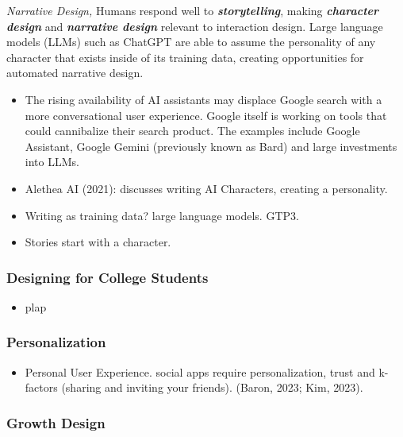 \documentclass[
  letterpaper,
  DIV=11,
  numbers=noendperiod]{scrartcl}
\providecommand{\tightlist}{%
  \setlength{\itemsep}{0pt}\setlength{\parskip}{0pt}}\usepackage{longtable,booktabs,array}
\begin{document}
\emph{Narrative Design,} Humans respond well to
\textbf{\emph{storytelling}}, making \textbf{\emph{character design}}
and \textbf{\emph{narrative design}} relevant to interaction design.
Large language models (LLMs) such as ChatGPT are able to assume the
personality of any character that exists inside of its training data,
creating opportunities for automated narrative design.

\begin{itemize}
\item
  The rising availability of AI assistants may displace Google search
  with a more conversational user experience. Google itself is working
  on tools that could cannibalize their search product. The examples
  include Google Assistant, Google Gemini (previously known as Bard) and
  large investments into LLMs.
\item
  Alethea AI (2021): discusses writing AI Characters, creating a
  personality.
\item
  Writing as training data? large language models. GTP3.
\item
  Stories start with a character.
\end{itemize}

\subsubsection{Designing for College
Students}\label{designing-for-college-students}

\begin{itemize}
\tightlist
\item
  plap
\end{itemize}

\subsubsection{Personalization}\label{personalization}

\begin{itemize}
\tightlist
\item
  Personal User Experience. social apps require personalization, trust
  and k-factors (sharing and inviting your friends). (Baron, 2023; Kim,
  2023).
\end{itemize}

\subsubsection{Growth Design}\label{growth-design}
\end{document}
